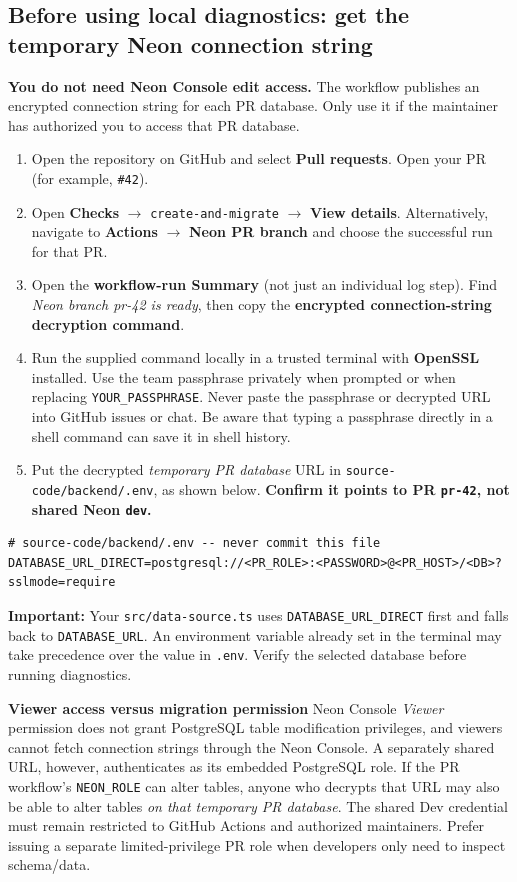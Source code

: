 \documentclass[10pt,a4paper]{article}
\begin{document}
\subsection*{Before using local diagnostics: get the temporary Neon connection string}
\textbf{You do not need Neon Console edit access.} The workflow publishes an encrypted connection string for each PR database. Only use it if the maintainer has authorized you to access that PR database.
\begin{enumerate}[leftmargin=21pt,itemsep=3pt]
  \item Open the repository on GitHub and select \textbf{Pull requests}. Open your PR (for example, \texttt{\#42}).
  \item Open \textbf{Checks} $\rightarrow$ \texttt{create-and-migrate} $\rightarrow$ \textbf{View details}. Alternatively, navigate to \textbf{Actions} $\rightarrow$ \textbf{Neon PR branch} and choose the successful run for that PR.
  \item Open the \textbf{workflow-run Summary} (not just an individual log step). Find \emph{Neon branch pr-42 is ready}, then copy the \textbf{encrypted connection-string decryption command}.
  \item Run the supplied command locally in a trusted terminal with \textbf{OpenSSL} installed. Use the team passphrase privately when prompted or when replacing \texttt{YOUR\_PASSPHRASE}. Never paste the passphrase or decrypted URL into GitHub issues or chat. Be aware that typing a passphrase directly in a shell command can save it in shell history.
  \item Put the decrypted \emph{temporary PR database} URL in \texttt{source-code/backend/.env}, as shown below. \textbf{Confirm it points to PR \texttt{pr-42}, not shared Neon \texttt{dev}.}
\end{enumerate}
\begin{lstlisting}[style=command]
# source-code/backend/.env -- never commit this file
DATABASE_URL_DIRECT=postgresql://<PR_ROLE>:<PASSWORD>@<PR_HOST>/<DB>?sslmode=require
\end{lstlisting}
\textbf{Important:} Your \texttt{src/data-source.ts} uses \texttt{DATABASE\_URL\_DIRECT} first and falls back to \texttt{DATABASE\_URL}. An environment variable already set in the terminal may take precedence over the value in \texttt{.env}. Verify the selected database before running diagnostics.

\begin{tcolorbox}[colback=pale,colframe=lightborder,boxrule=.7pt,arc=2mm]
\textbf{Viewer access versus migration permission}
Neon Console \emph{Viewer} permission does not grant PostgreSQL table modification privileges, and viewers cannot fetch connection strings through the Neon Console. A separately shared URL, however, authenticates as its embedded PostgreSQL role. If the PR workflow's \texttt{NEON\_ROLE} can alter tables, anyone who decrypts that URL may also be able to alter tables \emph{on that temporary PR database}. The shared Dev credential must remain restricted to GitHub Actions and authorized maintainers. Prefer issuing a separate limited-privilege PR role when developers only need to inspect schema/data.
\end{tcolorbox}
\end{document}
